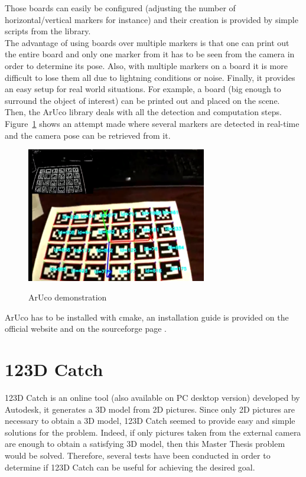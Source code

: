 Those boards can easily be configured (adjusting the number of horizontal/vertical markers for instance) and their creation is provided by simple scripts from the library.\\

The advantage of using boards over multiple markers is that one can print out the entire board and only one marker from it has to be seen from the camera in order to determine its pose. Also, with multiple markers on a board it is more difficult to lose them all due to lightning conditions or noise. Finally, it provides an easy setup for real world situations. For example, a board (big enough to surround the object of interest) can be printed out and placed on the scene. Then, the ArUco library deals with all the detection and computation steps. Figure~\ref{fig:aruco-demo} \cite{aruco} shows an attempt made where several markers are detected in real-time and the camera pose can be retrieved from it.\\

\begin{figure}[t]
\caption{ArUco demonstration}
\centering
    \includegraphics[width=0.7\textwidth]{images/aruco-demo.png}
\label{fig:aruco-demo}
\end{figure}

ArUco has to be installed with cmake, an installation guide is provided on the official website \cite{aruco} and on the sourceforge page \cite{augmented}. 

\section{123D Catch}
123D Catch is an online tool (also available on PC desktop version) developed by Autodesk, it generates a 3D model from 2D pictures. Since only 2D pictures are necessary to obtain a 3D model, 123D Catch seemed to provide easy and simple solutions for the problem. Indeed, if only pictures taken from the external camera are enough to obtain a satisfying 3D model, then this Master Thesis problem would be solved. Therefore, several tests have been conducted in order to determine if 123D Catch can be useful for achieving the desired goal.\\ 

